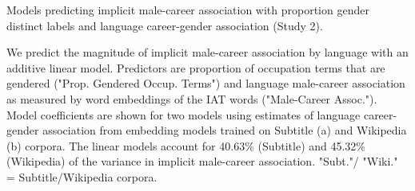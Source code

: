 \documentclass[]{article}
\begin{document}
Models predicting implicit male-career association with proportion gender
distinct labels and language career-gender association (Study 2).

We predict the magnitude of implicit male-career association by language with an additive linear model. Predictors are proportion of occupation terms that are gendered ("Prop. Gendered Occup. Terms") and language male-career association as measured by word embeddings of the IAT words ("Male-Career Assoc."). Model coefficients are shown for two models using estimates of language career-gender association from embedding models trained on Subtitle (a) and Wikipedia (b) corpora. The linear models account for 40.63\% (Subtitle) and 45.32\% (Wikipedia) of the variance in implicit male-career association.  "Subt."/ "Wiki." = Subtitle/Wikipedia corpora.
\end{document}
